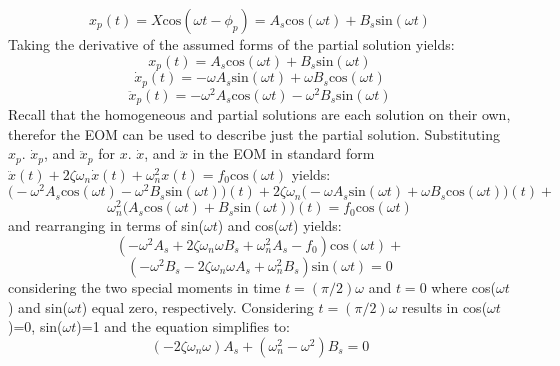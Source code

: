 \documentclass[12pt,letter]{article}
\numberwithin{ex}{section} %
\begin{document}
			\begin{equation}
				x_p(t) = X \text{cos}(\omega t - \phi_p) = A_s \text{cos}(\omega t) + B_s  \text{sin}(\omega t)
			\end{equation}			 
			Taking the derivative of the assumed forms of the partial solution yields:
			\begin{equation}
				x_p(t) = A_s \text{cos}(\omega t) + B_s  \text{sin}(\omega t)
			\end{equation}	
			\begin{equation}
				\dot{x}_p(t) = -\omega A_s \text{sin}(\omega t) + \omega B_s  \text{cos}(\omega t)
			\end{equation}				 
			\begin{equation}
				\ddot{x}_p(t) = -\omega^2 A_s \text{cos}(\omega t) - \omega^2 B_s  \text{sin}(\omega t)
			\end{equation}				
			Recall that the homogeneous and partial solutions are each solution on their own, therefor the EOM can be used to describe just the partial solution. Substituting $x_p$. $\dot{x}_p$, and $\ddot{x}_p$ for $x$. $\dot{x}$, and $\ddot{x}$ in the EOM in standard form $\ddot{x}(t)+2 \zeta \omega_n \dot{x}(t) +\omega_n^2x(t) = f_0\text{cos}(\omega t)$ yields:
			\begin{equation}
			 	\big(	-\omega^2 A_s \text{cos}(\omega t) - \omega^2 B_s  \text{sin}(\omega t) \big)(t)+2 \zeta \omega_n  \big( -\omega A_s \text{sin}(\omega t) + \omega B_s  \text{cos}(\omega t)  \big) (t) +
			\end{equation}
			\begin{equation*}
				\omega_n^2 \big( A_s \text{cos}(\omega t) + B_s  \text{sin}(\omega t) \big)(t) = f_0\text{cos}(\omega t)
			\end{equation*}				
			and rearranging in terms of sin($\omega t$) and cos($\omega t$) yields: 
			\begin{equation}
				(-\omega^2 A_s + 2 \zeta \omega_n \omega B_s + \omega_n^2 A_s -f_0) \text{cos}(\omega t) + 
			\end{equation}
			\begin{equation*}
				(-\omega^2 B_s - 2 \zeta \omega_n \omega A_s + \omega_n^2 B_s)\text{sin}(\omega t) =0
			\end{equation*}	
			considering the two special moments in time $t=(\pi/2)\omega$ and $t=0$ where cos($\omega t$) and sin($\omega t$) equal zero, respectively. Considering $t=(\pi/2)\omega$ results in cos($\omega t$)=0, sin($\omega t$)=1 and the equation simplifies to:
			\begin{equation}
				(-2\zeta \omega_n \omega)A_s + (\omega_n^2 - \omega^2)B_s = 0
			\end{equation}	
\end{document}
